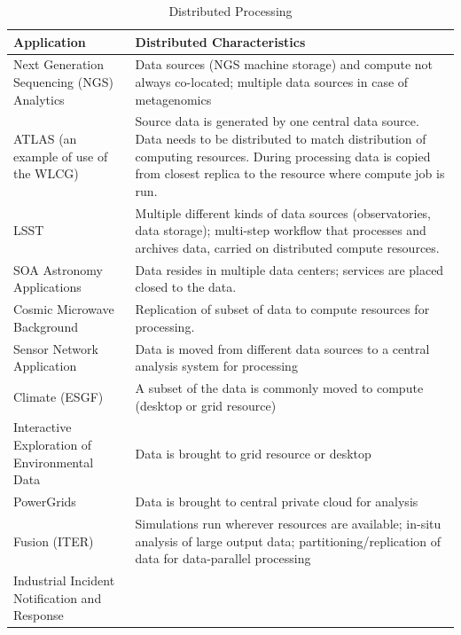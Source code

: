 \begin{table}[h]
  \begin{scriptsize}
    \begin{center}
      \caption{Distributed Processing}\label{tab:app_distributed_processing}
      \begin{tabular}{|p{3.5cm}|p{10.2cm}|}
		\hline
		\textbf{Application}  &\textbf{Distributed Characteristics} \\		
		\hline Next Generation Sequencing (NGS) Analytics &
                Data sources (NGS machine storage) and compute not
                always co-located; multiple data sources in case of
                metagenomics
		\\
		\hline ATLAS (an example of use of the WLCG) &Source
                data is generated by one central data source. Data
                needs to be distributed to match distribution of
                computing resources. During processing data is copied
                from closest replica to the resource where
		compute job is run. \\
		\hline LSST &Multiple different kinds of data sources
                (observatories, data storage); multi-step workflow
                that processes and archives data,
		carried on distributed compute resources.\\
		\hline SOA Astronomy Applications &Data resides in
                multiple data centers; services are placed closed to
		the data.\\
		\hline Cosmic Microwave Background &Replication of
                subset of data
		to compute resources for processing.\\
		\hline Sensor Network Application & Data is moved from
                different data sources to a central analysis
		system for processing\\
		\hline Climate (ESGF)
                &A subset of the data is commonly moved to compute (desktop or grid resource)\\
		\hline Interactive Exploration of Environmental Data
		&Data is brought to grid resource or desktop \\
		\hline PowerGrids
		&Data is brought to central private cloud for analysis\\
		\hline Fusion (ITER) &Simulations run wherever
                resources are available; in-situ analysis of large
                output data; partitioning/replication of data for
		data-parallel processing\\
		\hline Industrial Incident Notification and Response

\end{tabular}
\end{center}
\end{scriptsize}
\end{table}
